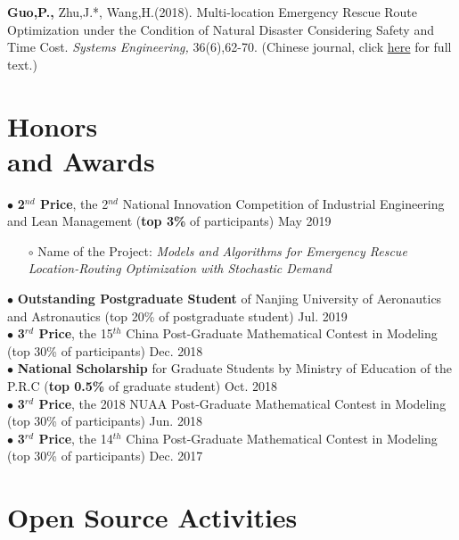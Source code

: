 \documentclass[margin]{res}
\begin{document}
\begin{resume}
[1] \textbf{Guo,P.,} Zhu,J.*, Wang,H.(2018). Multi-location Emergency Rescue Route Optimization under the Condition of Natural Disaster Considering Safety and Time Cost. \textit{Systems Engineering,} 36(6),62-70. (Chinese journal, click \href{https://docs.google.com/viewer?url=https://github.com/phguo/phguo.github.io/raw/master/full_text/zh-RiskTime.pdf}{here} for full text.) 






\section{\sc Honors \\and Awards}

$\bullet$ {\bf 2\(^{nd}\) Price}, the 2\(^{nd}\) National Innovation Competition of Industrial Engineering and Lean Management ({\bf top 3\%} of participants) \hfill May 2019 
\begin{itemize}  \itemsep -2pt  %
\item[\(\circ\)] Name of the Project: \textit{Models and Algorithms for Emergency Rescue Location-Routing Optimization with Stochastic Demand}
\end{itemize} \vspace{-1em}

$\bullet$ {\bf Outstanding Postgraduate Student} of Nanjing University of Aeronautics and Astronautics (top 20\% of postgraduate student) \hfill Jul. 2019 \\
$\bullet$ {\bf 3\(^{rd}\) Price}, the 15\(^{th}\) China Post-Graduate Mathematical Contest in Modeling (top 30\% of participants) \hfill Dec. 2018 \\
$\bullet$ {\bf National Scholarship} for Graduate Students by Ministry of Education of the P.R.C ({\bf top 0.5\%} of graduate student) \hfill Oct. 2018 \\
$\bullet$ {\bf 3\(^{rd}\) Price}, the 2018 NUAA Post-Graduate Mathematical Contest in Modeling (top 30\% of participants) \hfill Jun. 2018 \\
$\bullet$ {\bf 3\(^{rd}\) Price}, the 14\(^{th}\) China Post-Graduate Mathematical Contest in Modeling (top 30\% of participants) \hfill Dec. 2017





\section{\sc Open Source Activities} 


\end{resume}
\end{document}
